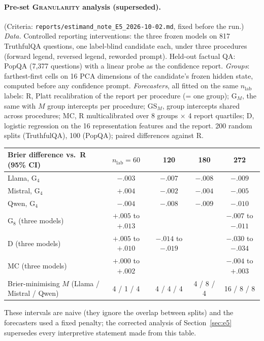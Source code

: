 \documentclass[11pt]{article}
\theoremstyle{definition}
\theoremstyle{remark}
\newcommand{\1}{\mathbf{1}}
\newcommand{\expname}[1]{\textsc{#1}}
\begin{document}
\paragraph{Pre-set \expname{Granularity} analysis (superseded).}

(Criteria: \texttt{reports/estimand\_note\_E5\_2026-10-02.md}, fixed before the run.)
\emph{Data.} Controlled reporting interventions: the three frozen models on 817 TruthfulQA
questions, one label-blind candidate each, under three procedures (forward legend, reversed
legend, reworded prompt). Held-out factual QA: PopQA (7{,}377 questions) with a linear probe as
the confidence report. \emph{Groups}: farthest-first cells on 16 PCA dimensions of the candidate's
frozen hidden state, computed before any confidence prompt. \emph{Forecasters}, all fitted on the
same $n_{\mathrm{lab}}$ labels: R, Platt recalibration of the report per procedure (= one group);
G$_M$, the same with $M$ group intercepts per procedure; GS$_M$, group intercepts shared across
procedures; MC, R multicalibrated over 8 groups $\times$ 4 report quartiles; D, logistic
regression on the 16 representation features and the report. 200 random splits (TruthfulQA), 100
(PopQA); paired differences against R.

\begin{center}\small
\begin{tabular}{lcccc}
\toprule
Brier difference vs.\ R (95\% CI) & $n_{\mathrm{lab}}=60$ & 120 & 180 & 272\\
\midrule
Llama, G$_4$   & $-.003$ & $-.007$ & $-.008$ & $-.009$\\
Mistral, G$_4$ & $\mathbf{+.004}$ & $-.002$ & $-.004$ & $-.005$\\
Qwen, G$_4$    & $-.004$ & $-.008$ & $-.009$ & $-.010$\\
G$_8$ (three models) & $+.005$ to $+.013$ & & & $-.007$ to $-.011$\\
D (three models) & $+.005$ to $+.010$ & $-.014$ to $-.019$ & & $-.030$ to $-.034$\\
MC (three models) & $+.000$ to $+.002$ & & & $-.004$ to $+.003$\\
\midrule
Brier-minimising $M$ (Llama / Mistral / Qwen) & 4 / 1 / 4 & 4 / 4 / 4 & 4 / 8 / 4 & 16 / 8 / 8\\
\bottomrule
\end{tabular}
\end{center}
These intervals are naive (they ignore the overlap between splits) and the forecasters used a fixed
penalty; the corrected analysis of Section~\ref{sec:e5} supersedes every interpretive statement made
from this table.
\end{document}
